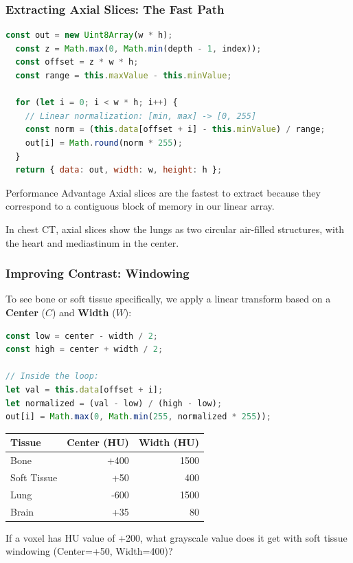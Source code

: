 \begin{frame}[fragile]
\frametitle{Extracting Axial Slices: The Fast Path}
\begin{lstlisting}[language=JavaScript]
  const out = new Uint8Array(w * h);
  const z = Math.max(0, Math.min(depth - 1, index));
  const offset = z * w * h;
  const range = this.maxValue - this.minValue;

  for (let i = 0; i < w * h; i++) {
    // Linear normalization: [min, max] -> [0, 255]
    const norm = (this.data[offset + i] - this.minValue) / range;
    out[i] = Math.round(norm * 255);
  }
  return { data: out, width: w, height: h };
\end{lstlisting}
\begin{block}{Performance Advantage}
Axial slices are the fastest to extract because they correspond to a contiguous block of memory in our linear array.
\end{block}

In chest CT, axial slices show the lungs as two circular air-filled structures, with the heart and mediastinum in the center.
\end{frame}

\begin{frame}[fragile]
\frametitle{Improving Contrast: Windowing}
To see bone or soft tissue specifically, we apply a linear transform based on a \textbf{Center} ($C$) and \textbf{Width} ($W$):

\begin{lstlisting}[language=JavaScript]
const low = center - width / 2;
const high = center + width / 2;

// Inside the loop:
let val = this.data[offset + i];
let normalized = (val - low) / (high - low);
out[i] = Math.max(0, Math.min(255, normalized * 255));
\end{lstlisting}

\begin{table}
\small
\centering
{}
\begin{tabular}{lrr}
\toprule
\textbf{Tissue} & \textbf{Center (HU)} & \textbf{Width (HU)} \\
\midrule
Bone & +400 & 1500 \\
Soft Tissue & +50 & 400 \\
Lung & -600 & 1500 \\
Brain & +35 & 80 \\
\midrule
\end{tabular}
\end{table}

If a voxel has HU value of +200, what grayscale value does it get with soft tissue windowing (Center=+50, Width=400)?
\end{frame}

